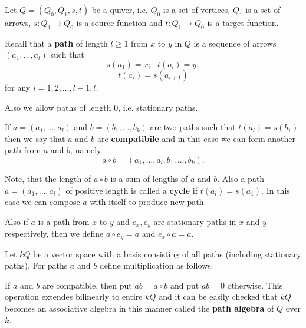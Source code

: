 \documentclass[12pt]{article}
\begin{document}
Let $Q=(Q_0,Q_1,s,t)$ be a quiver, i.e. $Q_0$ is a set of vertices, $Q_1$ is a set of arrows, $s:Q_1\to Q_0$ is a source function and $t:Q_1\to Q_0$ is a target function.

Recall that a \textbf{path} of length $l\geqslant 1$ from $x$ to $y$ in $Q$ is a sequence of arrows $(a_1,\ldots,a_l)$ such that 
$$s(a_1)=x;\ \ \ t(a_l)=y;$$
$$t(a_i)=s(a_{i+1})$$
for any $i=1,2,\ldots,l-1,l$.

Also we allow paths of length $0$, i.e. stationary paths.

If $a=(a_1,\ldots,a_l)$ and $b=(b_1,\ldots, b_k)$ are two paths such that $t(a_l)=s(b_1)$ then we say that $a$ and $b$ are \textbf{compatibile} and in this case we can form another path from $a$ and $b$, namely
$$a\circ b=(a_1,\ldots,a_l,b_1,\ldots, b_k).$$

Note, that the length of $a\circ b$ is a sum of lengths of $a$ and $b$. Also a path $a=(a_1,\ldots,a_l)$ of positive length is called a \textbf{cycle} if $t(a_l)=s(a_1)$. In this case we can compose $a$ with itself to produce new path.

Also if $a$ is a path from $x$ to $y$ and $e_x, e_y$ are stationary paths in $x$ and $y$ respectively, then we define $a\circ e_y=a$ and $e_x\circ a=a$.

Let $kQ$ be a vector space with a basis consisting of all paths (including stationary paths). For paths $a$ and $b$ define multiplication as follows:

If $a$ and $b$ are compatible, then put $ab=a\circ b$ and put $ab=0$ otherwise. This operation extendes bilinearly to entire $kQ$ and it can be easily checked that $kQ$ becomes an associative algebra in this manner called the \textbf{path algebra} of $Q$ over $k$.
\end{document}
